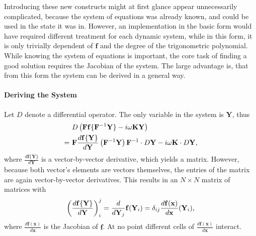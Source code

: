 Introducing these new constructs might at first glance appear unnecessarily complicated, because the system of equations was already known, and could be used in the state it was in.
However, an implementation in the basic form would have required different treatment for each dynamic system, while in this form, it is only trivially dependent of $\mathbf f$ and the degree of the trigonometric polynomial.
While knowing the system of equations is important, the core task of finding a good solution requires the Jacobian of the system.
The large advantage is, that from this form the system can be derived in a general way.

\paragraph{Deriving the System} Let $D$ denote a differential operator.
The only variable in the system is $\mathbf Y$, thus
	\begin{align}
		& D \left( \mathbf{F} \mathbf{f}\{\mathbf{F}^{-1} \mathbf{Y}\} - i \omega \mathbf K \mathbf Y \right) \nonumber \\
		=\ & \mathbf{F} \frac{d \mathbf{f}\{\mathbf Y\}}{d\mathbf Y} \left( \mathbf{F}^{-1} \mathbf{Y} \right) \mathbf{F}^{-1} \cdot D \mathbf Y - i \omega \mathbf K \cdot D \mathbf Y \label{eq:vecsys} \text,
	\end{align}
where $\frac{d \mathbf{f} \{ \mathbf Y \}}{d \mathbf Y}$ is a vector-by-vector derivative, which yields a matrix.
However, because both vector's elements are vectors themselves, the entries of the matrix are again vector-by-vector derivatives.
This results in an $N \times N$ matrix of matrices with
	\[
			\left( \frac{d \mathbf{f}\{\mathbf Y\}}{d\mathbf Y} \right)_i^j = \frac{d}{d\mathbf Y_j} \mathbf f (\mathbf Y_i) = \delta_{ij} \frac{d \mathbf f(\mathbf x)}{d \mathbf x}(\mathbf Y_i) \text, %
	\]
where $\frac{d \mathbf f(\mathbf x)}{d\mathbf x}$ is the Jacobian of $\mathbf f$.
At no point different cells of $\frac{d \mathbf f(\mathbf x)}{d\mathbf x}$ interact.

